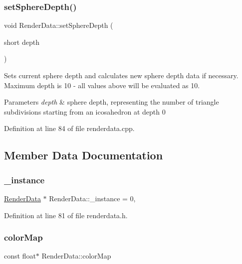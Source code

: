 \subsubsection{\texorpdfstring{set\+Sphere\+Depth()}{setSphereDepth()}}
{\footnotesize\ttfamily void Render\+Data\+::set\+Sphere\+Depth (\begin{DoxyParamCaption}\item[{short}]{depth }\end{DoxyParamCaption})}

Sets current sphere depth and calculates new sphere depth data if necessary. Maximum depth is 10 -\/ all values above will be evaluated as 10. 
\begin{DoxyParams}{Parameters}
{\em depth} & sphere depth, representing the number of triangle subdivisions starting from an icosahedron at depth 0 \\
\hline
\end{DoxyParams}


Definition at line 84 of file renderdata.\+cpp.



\subsection{Member Data Documentation}
\mbox{\label{class_render_data_a133da67a805762c95284248a7ea1526c}} 
\subsubsection{\texorpdfstring{\+\_\+instance}{\_instance}}
{\footnotesize\ttfamily \hyperlink{class_render_data}{Render\+Data} $\ast$ Render\+Data\+::\+\_\+instance = 0\hspace{0.3cm}{\ttfamily [static]}, {\ttfamily [private]}}



Definition at line 81 of file renderdata.\+h.

\mbox{\label{class_render_data_a78b66cb01444d2d36c3ed9179705a716}} 
\subsubsection{\texorpdfstring{color\+Map}{colorMap}}
{\footnotesize\ttfamily const float$\ast$ Render\+Data\+::color\+Map\hspace{0.3cm}{\ttfamily [private]}}



